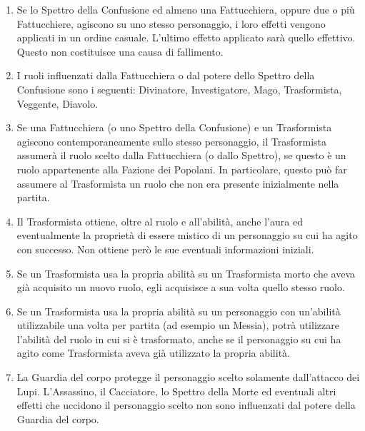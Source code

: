 \documentclass[a4paper,10pt]{article}
\begin{document}
\begin{enumerate}
	\item Se lo Spettro della Confusione ed almeno una Fattucchiera, oppure due o più Fattucchiere, agiscono su uno stesso personaggio, i loro effetti vengono applicati in un ordine casuale. L'ultimo effetto applicato sarà quello effettivo. Questo non costituisce una causa di fallimento.
	
	\item I ruoli influenzati dalla Fattucchiera o dal potere dello Spettro della Confusione sono i seguenti: Divinatore, Investigatore, Mago, Trasformista, Veggente, Diavolo.
	
	\item Se una Fattucchiera (o uno Spettro della Confusione) e un Trasformista agiscono contemporaneamente sullo stesso personaggio, il Trasformista assumerà il ruolo scelto dalla Fattucchiera (o dallo Spettro), se questo è un ruolo appartenente alla Fazione dei Popolani. In particolare, questo può far assumere al Trasformista un ruolo che non era presente inizialmente nella partita.
	
	\item Il Trasformista ottiene, oltre al ruolo e all'abilità, anche l'aura ed eventualmente la proprietà di essere mistico di un personaggio su cui ha agito con successo. Non ottiene però le sue eventuali informazioni iniziali.
	
	\item Se un Trasformista usa la propria abilità su un Trasformista morto che aveva già acquisito un nuovo ruolo, egli acquisisce a sua volta quello stesso ruolo. %
	
	\item Se un Trasformista usa la propria abilità su un personaggio con un'abilità utilizzabile una volta per partita (ad esempio un Messia), potrà utilizzare l'abilità del ruolo in cui si è trasformato, anche se il personaggio su cui ha agito come Trasformista aveva già utilizzato la propria abilità.
	
	\item La Guardia del corpo protegge il personaggio scelto solamente dall'attacco dei Lupi. L'Assassino, il Cacciatore, lo Spettro della Morte ed eventuali altri effetti che uccidono il personaggio scelto non sono influenzati dal potere della Guardia del corpo.
	

\end{enumerate}
\end{document}
